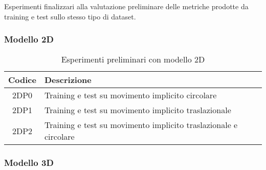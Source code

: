 Esperimenti finalizzari alla valutazione preliminare delle metriche prodotte da training e test sullo stesso tipo di dataset.

\subsubsection{Modello 2D}

\begin{table}[H]
	\begin{tabularx}{\textwidth}{|c|X|c|c|}
		\hline 
		\textbf{Codice} &
		\textbf{Descrizione} \\ 
		\hline
		2DP0 &
		Training e test su movimento implicito circolare \\ 
		\hline
		2DP1 &
		Training e test su movimento implicito traslazionale \\ 
		\hline
		2DP2 & 
		Training e test su movimento implicito traslazionale e circolare \\ 
		\hline 
	\end{tabularx}
	\caption{Esperimenti preliminari con modello 2D}
	\label{esperimenti-preliminari-2D}
\end{table}

\newpage

\subsubsection{Modello 3D}

